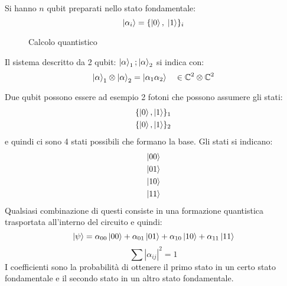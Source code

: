 \documentclass[a4paper]{article}
\begin{document}
\vspace{1em}
\noindent
Si hanno \( n \) qubit preparati nello stato fondamentale:
\[
  \ket{\alpha_i} = \{\ket{0}, \; \ket{1}\}_i
\] 
\begin{figure}[H]
  \centering
  \caption{Calcolo quantistico}
\end{figure}
\noindent
Il sistema descritto da 2 qubit: $\ket{\alpha}_1 ; \ket{\alpha}_2$ si indica con:
\[
  \ket{\alpha}_1 \otimes \ket{\alpha}_2 = \ket{\alpha_1 \alpha_2} \quad \in \mathbb{C}^2 \otimes \mathbb{C}^2
\] 

\vspace{1em}
\noindent
Due qubit possono essere ad esempio 2 fotoni che possono assumere gli stati:
\[
  \begin{aligned}
    \{\ket{0}, \ket{1}\}_1\\
    \{\ket{0}, \ket{1}\}_2\\
  \end{aligned}
\] 
e quindi ci sono 4 stati possibili che formano la base. Gli stati si indicano:
\[
  \begin{aligned}
    \ket{00}\\
    \ket{01}\\
    \ket{10}\\
    \ket{11}
  \end{aligned}
\] 
Qualsiasi combinazione di questi consiste in una formazione quantistica trasportata all'interno
del circuito e quindi:
\[
  \ket{\psi} = \alpha_{00} \ket{00} + \alpha_{01} \ket{01} + \alpha_{10} \ket{10} + \alpha_{11} \ket{11}
\] 
\[
  \sum |\alpha_{ij}|^2 = 1
\] 
I coefficienti sono la probabilità di ottenere il primo stato in un certo stato fondamentale
e il secondo stato in un altro stato fondamentale.
\end{document}
